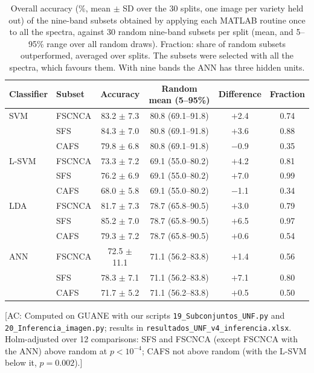 \documentclass[final,5p,times,twocolumn]{elsarticle}
\newcommand{\added}[1]{{\color{blue}#1}}
\newcommand{\acnote}[1]{{\color{red}\small\textsf{[AC: #1]}}}
\begin{document}
\begin{table}[htbp!]
    \centering
    \caption{\added{Overall accuracy (\%, mean $\pm$ SD over the 30 splits, one image per variety held out) of the nine-band subsets obtained by applying each MATLAB routine once to all the spectra, against 30 random nine-band subsets per split (mean, and 5--95\% range over all random draws). Fraction: share of random subsets outperformed, averaged over splits. The subsets were selected with all the spectra, which favours them. With nine bands the ANN has three hidden units.}}
    \label{tab:sub9}
    \begin{tabular}{llcccc}
    \hline
    Classifier & Subset & Accuracy & Random mean (5--95\%) & Difference & Fraction \\
    \hline
    SVM   & FSCNCA & 83.2 $\pm$ 7.3 & 80.8 (69.1--91.8) & $+$2.4 & 0.74 \\
          & SFS    & 84.3 $\pm$ 7.0 & 80.8 (69.1--91.8) & $+$3.6 & 0.88 \\
          & CAFS   & 79.8 $\pm$ 6.8 & 80.8 (69.1--91.8) & $-$0.9 & 0.35 \\
    L-SVM & FSCNCA & 73.3 $\pm$ 7.2 & 69.1 (55.0--80.2) & $+$4.2 & 0.81 \\
          & SFS    & 76.2 $\pm$ 6.9 & 69.1 (55.0--80.2) & $+$7.0 & 0.99 \\
          & CAFS   & 68.0 $\pm$ 5.8 & 69.1 (55.0--80.2) & $-$1.1 & 0.34 \\
    LDA   & FSCNCA & 81.7 $\pm$ 7.3 & 78.7 (65.8--90.5) & $+$3.0 & 0.79 \\
          & SFS    & 85.2 $\pm$ 7.0 & 78.7 (65.8--90.5) & $+$6.5 & 0.97 \\
          & CAFS   & 79.3 $\pm$ 7.2 & 78.7 (65.8--90.5) & $+$0.6 & 0.54 \\
    ANN   & FSCNCA & 72.5 $\pm$ 11.1 & 71.1 (56.2--83.8) & $+$1.4 & 0.56 \\
          & SFS    & 78.3 $\pm$ 7.1 & 71.1 (56.2--83.8) & $+$7.1 & 0.80 \\
          & CAFS   & 71.7 $\pm$ 5.2 & 71.1 (56.2--83.8) & $+$0.5 & 0.50 \\
    \hline
    \end{tabular}
\end{table}
\acnote{Computed on GUANE with our scripts \texttt{19\_Subconjuntos\_UNF.py} and \texttt{20\_Inferencia\_imagen.py}; results in \texttt{resultados\_UNF\_v4\_inferencia.xlsx}. Holm-adjusted over 12 comparisons: SFS and FSCNCA (except FSCNCA with the ANN) above random at $p<10^{-4}$; CAFS not above random (with the L-SVM below it, $p=0.002$).}
\end{document}
